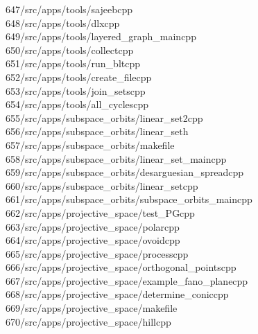 \begin{tabbing}
647\>/src/apps/tools/sajeebcpp\\[0pt]
648\>/src/apps/tools/dlxcpp\\[0pt]
649\>/src/apps/tools/layered\_graph\_maincpp\\[0pt]
650\>/src/apps/tools/collectcpp\\[0pt]
651\>/src/apps/tools/run\_bltcpp\\[0pt]
652\>/src/apps/tools/create\_filecpp\\[0pt]
653\>/src/apps/tools/join\_setscpp\\[0pt]
654\>/src/apps/tools/all\_cyclescpp\\[0pt]
655\>/src/apps/subspace\_orbits/linear\_set2cpp\\[0pt]
656\>/src/apps/subspace\_orbits/linear\_seth\\[0pt]
657\>/src/apps/subspace\_orbits/makefile\\[0pt]
658\>/src/apps/subspace\_orbits/linear\_set\_maincpp\\[0pt]
659\>/src/apps/subspace\_orbits/desarguesian\_spreadcpp\\[0pt]
660\>/src/apps/subspace\_orbits/linear\_setcpp\\[0pt]
661\>/src/apps/subspace\_orbits/subspace\_orbits\_maincpp\\[0pt]
662\>/src/apps/projective\_space/test\_PGcpp\\[0pt]
663\>/src/apps/projective\_space/polarcpp\\[0pt]
664\>/src/apps/projective\_space/ovoidcpp\\[0pt]
665\>/src/apps/projective\_space/processcpp\\[0pt]
666\>/src/apps/projective\_space/orthogonal\_pointscpp\\[0pt]
667\>/src/apps/projective\_space/example\_fano\_planecpp\\[0pt]
668\>/src/apps/projective\_space/determine\_coniccpp\\[0pt]
669\>/src/apps/projective\_space/makefile\\[0pt]
670\>/src/apps/projective\_space/hillcpp\\[0pt]

\end{tabbing}
